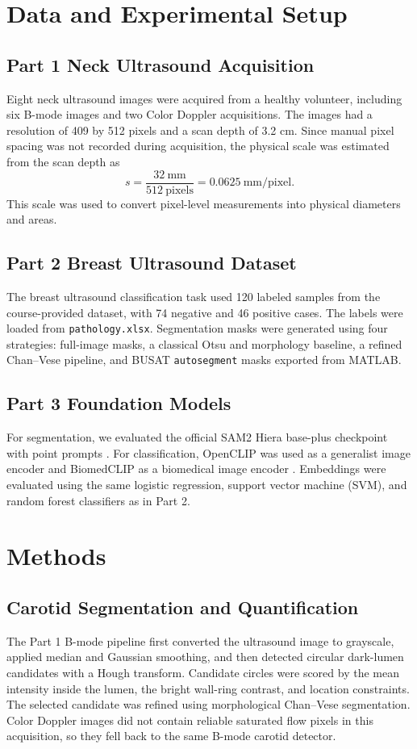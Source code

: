 \documentclass[conference]{IEEEtran}
\begin{document}
\section{Data and Experimental Setup}
\subsection{Part 1 Neck Ultrasound Acquisition}
Eight neck ultrasound images were acquired from a healthy volunteer, including six B-mode images and two Color Doppler acquisitions. The images had a resolution of 409 by 512 pixels and a scan depth of 3.2 cm. Since manual pixel spacing was not recorded during acquisition, the physical scale was estimated from the scan depth as
\begin{equation}
    s = \frac{32~\mathrm{mm}}{512~\mathrm{pixels}} = 0.0625~\mathrm{mm/pixel}.
\end{equation}
This scale was used to convert pixel-level measurements into physical diameters and areas.

\subsection{Part 2 Breast Ultrasound Dataset}
The breast ultrasound classification task used 120 labeled samples from the course-provided dataset, with 74 negative and 46 positive cases. The labels were loaded from \texttt{pathology.xlsx}. Segmentation masks were generated using four strategies: full-image masks, a classical Otsu and morphology baseline, a refined Chan--Vese pipeline, and BUSAT \texttt{autosegment} masks exported from MATLAB.

\subsection{Part 3 Foundation Models}
For segmentation, we evaluated the official SAM2 Hiera base-plus checkpoint with point prompts \cite{ravi2024sam2}. For classification, OpenCLIP was used as a generalist image encoder and BiomedCLIP as a biomedical image encoder \cite{zhang2023biomedclip}. Embeddings were evaluated using the same logistic regression, support vector machine (SVM), and random forest classifiers as in Part 2.

\section{Methods}
\subsection{Carotid Segmentation and Quantification}
The Part 1 B-mode pipeline first converted the ultrasound image to grayscale, applied median and Gaussian smoothing, and then detected circular dark-lumen candidates with a Hough transform. Candidate circles were scored by the mean intensity inside the lumen, the bright wall-ring contrast, and location constraints. The selected candidate was refined using morphological Chan--Vese segmentation. Color Doppler images did not contain reliable saturated flow pixels in this acquisition, so they fell back to the same B-mode carotid detector.
\end{document}
